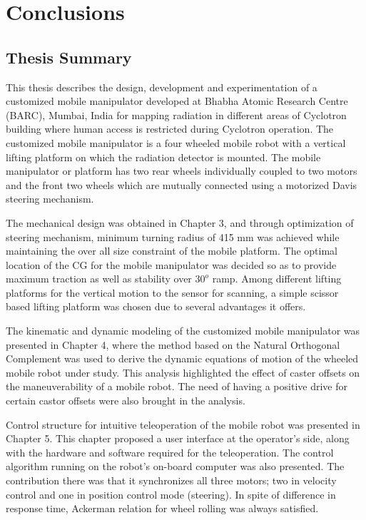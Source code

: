 \chapter{Conclusions}
\label{ch_8:Con}

\section{Thesis Summary}
This thesis describes the design, development and experimentation of a customized mobile manipulator developed at Bhabha Atomic Research Centre (BARC), Mumbai, India  for mapping radiation in different areas of Cyclotron building where human access is restricted during Cyclotron operation. The customized mobile manipulator is a four wheeled mobile robot with a vertical lifting platform on which the radiation detector is mounted. The mobile manipulator or  platform has two rear wheels individually  coupled to   two motors and the front two wheels which are mutually connected using a motorized Davis steering mechanism.


The mechanical design was obtained in Chapter 3,  and through optimization  of steering mechanism, minimum turning  radius of 415 mm was achieved  while maintaining the over all size constraint of the mobile platform. The optimal location of the CG for  the mobile manipulator was decided so as to provide maximum traction as well as  stability over $30^o$ ramp.  Among  different lifting platforms for the  vertical motion to the sensor for scanning, a simple scissor based lifting platform was chosen due to several advantages it offers. 

The kinematic and dynamic modeling of the customized mobile manipulator was presented in Chapter 4, where the method based on the  Natural Orthogonal Complement was used to derive the dynamic equations of motion of the wheeled mobile robot under study. This analysis highlighted the  effect of caster  offsets on the maneuverability of a mobile robot. The need of having a positive drive for certain castor offsets were also brought in the analysis. 


Control structure for intuitive teleoperation of the mobile robot was presented in Chapter 5. This chapter proposed a  user interface at the operator's side, along with the hardware and software required for the teleoperation. The control algorithm running on the robot's on-board computer was also presented. The contribution there was that it synchronizes all three motors; two in velocity control  and one in position control mode (steering). In spite of difference in response time, Ackerman relation for wheel rolling was always satisfied. 

